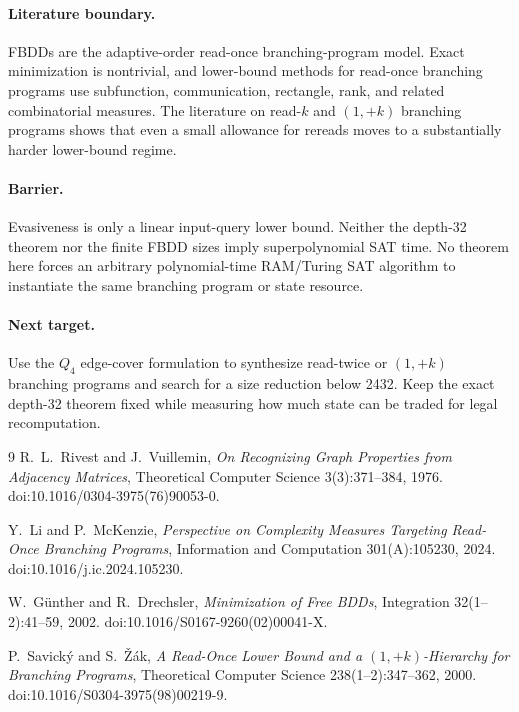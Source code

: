 \paragraph{Literature boundary.}
FBDDs are the adaptive-order read-once branching-program model. Exact minimization is nontrivial, and lower-bound methods for read-once branching programs use subfunction, communication, rectangle, rank, and related combinatorial measures. The literature on read-$k$ and $(1,+k)$ branching programs shows that even a small allowance for rereads moves to a substantially harder lower-bound regime.

\paragraph{Barrier.}
Evasiveness is only a linear input-query lower bound. Neither the depth-32 theorem nor the finite FBDD sizes imply superpolynomial SAT time. No theorem here forces an arbitrary polynomial-time RAM/Turing SAT algorithm to instantiate the same branching program or state resource.

\paragraph{Next target.}
Use the $Q_4$ edge-cover formulation to synthesize read-twice or $(1,+k)$ branching programs and search for a size reduction below 2432. Keep the exact depth-32 theorem fixed while measuring how much state can be traded for legal recomputation.

\begin{thebibliography}{9}
R.~L.~Rivest and J.~Vuillemin,
\emph{On Recognizing Graph Properties from Adjacency Matrices},
Theoretical Computer Science 3(3):371--384, 1976.
doi:10.1016/0304-3975(76)90053-0.

Y.~Li and P.~McKenzie,
\emph{Perspective on Complexity Measures Targeting Read-Once Branching Programs},
Information and Computation 301(A):105230, 2024.
doi:10.1016/j.ic.2024.105230.

W.~G\"unther and R.~Drechsler,
\emph{Minimization of Free BDDs},
Integration 32(1--2):41--59, 2002.
doi:10.1016/S0167-9260(02)00041-X.

P.~Savick\'y and S.~\v{Z}\'ak,
\emph{A Read-Once Lower Bound and a $(1,+k)$-Hierarchy for Branching Programs},
Theoretical Computer Science 238(1--2):347--362, 2000.
doi:10.1016/S0304-3975(98)00219-9.
\end{thebibliography}

